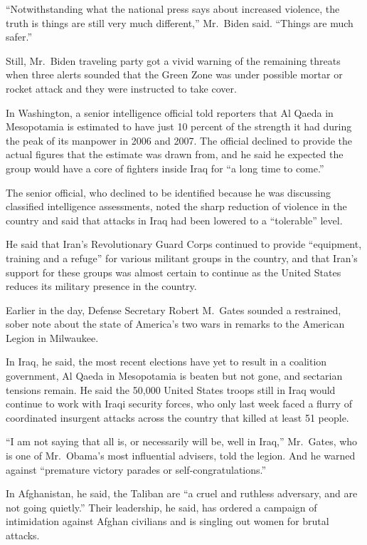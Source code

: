 ﻿\documentclass[12pt]{article}
\begin{document}
``Notwithstanding what the national press says about increased violence, the truth is things are
still very much different,'' Mr.~Biden said. ``Things are much safer.''

Still, Mr.~Biden traveling party got a vivid warning of the remaining threats when three alerts
sounded that the Green Zone was under possible mortar or rocket attack and they were instructed to
take cover.

In Washington, a senior intelligence official told reporters that Al Qaeda in Mesopotamia is
estimated to have just 10 percent of the strength it had during the peak of its manpower in 2006 and
2007. The official declined to provide the actual figures that the estimate was drawn from, and he
said he expected the group would have a core of fighters inside Iraq for ``a long time to come.''

The senior official, who declined to be identified because he was discussing classified intelligence
assessments, noted the sharp reduction of violence in the country and said that attacks in Iraq had
been lowered to a ``tolerable'' level.

He said that Iran's Revolutionary Guard Corps continued to provide ``equipment, training and a
refuge'' for various militant groups in the country, and that Iran's support for these groups was
almost certain to continue as the United States reduces its military presence in the country.

Earlier in the day, Defense Secretary Robert M.~Gates sounded a restrained, sober note about the
state of America's two wars in remarks to the American Legion in Milwaukee.

In Iraq, he said, the most recent elections have yet to result in a coalition government, Al Qaeda
in Mesopotamia is beaten but not gone, and sectarian tensions remain. He said the 50,000 United
States troops still in Iraq would continue to work with Iraqi security forces, who only last week
faced a flurry of coordinated insurgent attacks across the country that killed at least 51 people.

``I am not saying that all is, or necessarily will be, well in Iraq,'' Mr.~Gates, who is one of
Mr.~Obama's most influential advisers, told the legion. And he warned against ``premature victory
parades or self-congratulations.''

In Afghanistan, he said, the Taliban are ``a cruel and ruthless adversary, and are not going
quietly.'' Their leadership, he said, has ordered a campaign of intimidation against Afghan
civilians and is singling out women for brutal attacks.
\end{document}
